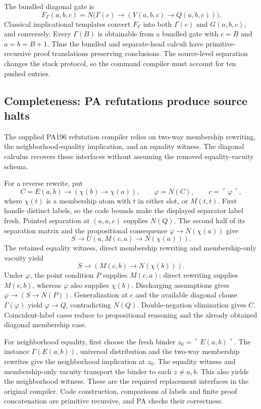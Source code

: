 The bundled diagonal gate is
\[
 F_\Gamma(a,b,c)=N\bigl(\Gamma(c)\to(V(a,b,c)\to Q(a,b,c))\bigr).
\]
Classical implicational templates convert $F_\Gamma$ into both $\Gamma(c)$
and $G(a,b,c)$, and conversely. Every $\Gamma(B)$ is obtainable from a
bundled gate with $c=B$ and $a=b=B+1$. Thus the bundled and separate-head
calculi have primitive-recursive proof translations preserving conclusions.
The source-level separation changes the stack protocol, so the command
compiler must account for ten pushed entries.

\subsection{Completeness: PA refutations produce source halts}

The supplied PA196 refutation compiler relies on two-way membership
rewriting, the neighborhood-equality implication, and an equality witness.
The diagonal calculus recovers these interfaces without assuming the
removed equality-vacuity schema.

For a reverse rewrite, put
\[
 C=E(a,b)\to(\chi(b)\to\chi(a)),\qquad
 \varphi=N(C),\qquad c=\ulcorner\varphi\urcorner,
\]
where $\chi(t)$ is a membership atom with $t$ in either slot, or $M(t,t)$.
First handle distinct labels, so the code bounds make the displayed
separator label fresh. Pointed separation at $(a,a,c)$ supplies $N(Q)$.
The second half of its separation matrix and the propositional consequence
$\varphi\to N(\chi(a))$ give
\[
 S\to U(a,M(c,a)\to N(\chi(a))).
\]
The retained equality witness, direct membership rewriting and
membership-only vacuity yield
\[
 S\to(M(c,b)\to N(\chi(b))).
\]
Under $\varphi$, the point condition $P$ supplies $M(c,a)$; direct rewriting
supplies $M(c,b)$, whereas $\varphi$ also supplies $\chi(b)$. Discharging
assumptions gives $\varphi\to(S\to N(P))$.
Generalization at $c$ and the available diagonal clause
$\Gamma(\varphi)$ yield $\varphi\to Q$, contradicting $N(Q)$.
Double-negation elimination gives $C$. Coincident-label cases reduce to
propositional reasoning and the already obtained diagonal membership case.

For neighborhood equality, first choose the fresh binder
$z_0=\ulcorner E(a,b)\urcorner$. The instance $\Gamma(E(a,b))$, universal
distribution and the two-way membership rewrites give the neighborhood
implication at $z_0$. The equality witness and membership-only vacuity
transport the binder to each $z\ne a,b$. This also yields the neighborhood
witness. These are the required replacement interfaces in the original
compiler. Code construction, comparisons of labels and finite proof
concatenation are primitive recursive, and PA checks their correctness.

